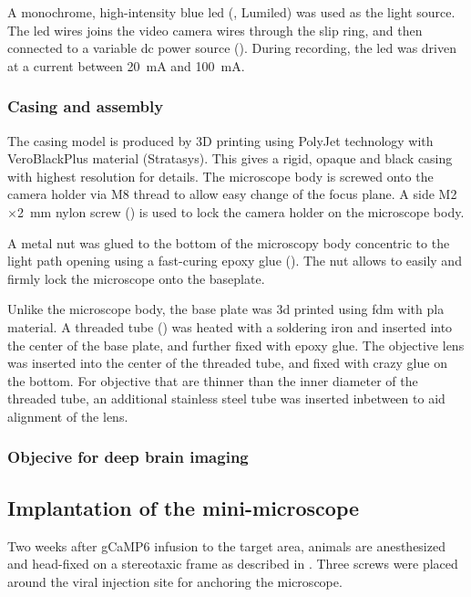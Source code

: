 A monochrome, high-intensity blue \gls{led} (, Lumiled) was used as the light source. The \gls{led} wires joins the video camera wires through the slip ring, and then connected to a variable \gls{dc} power source (). During recording, the \gls{led} was driven at a current between \SI{20}{\mA} and \SI{100}{\mA}.

\subsubsection{Casing and assembly}
The casing model is produced by 3D printing using PolyJet technology with VeroBlackPlus material (Stratasys). This gives a rigid, opaque and black casing with highest resolution for details. The microscope body is screwed onto the camera holder via M8 thread to allow easy change of the focus plane. A side M2$\times$\SI{2}{\mm} nylon screw () is used to lock the camera holder on the microscope body.

A metal nut  was glued to the bottom of the microscopy body concentric to the light path opening using a fast-curing epoxy glue (). The nut allows to easily and firmly lock the microscope onto the baseplate.

Unlike the microscope body, the base plate was 3d printed using \gls{fdm} with \gls{pla} material. A threaded tube () was heated with a soldering iron and inserted into the center of the base plate, and further fixed with epoxy glue. The objective lens was inserted into the center of the threaded tube, and fixed with crazy glue on the bottom. For objective that are thinner than the inner diameter of the threaded tube, an additional stainless steel tube was inserted inbetween to aid alignment of the lens.

\subsubsection{Objecive for deep brain imaging} \label{objective assembly}

\subsection{Implantation of the mini-microscope}

Two weeks after gCaMP6 infusion to the target area, animals are anesthesized and head-fixed on a stereotaxic frame as described in . Three screws were placed around the viral injection site for anchoring the microscope. 


